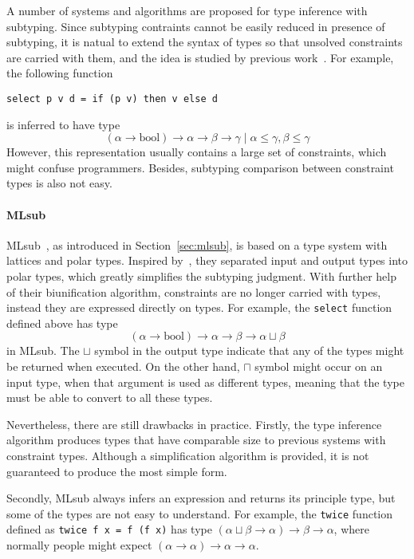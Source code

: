 A number of systems and algorithms are proposed for type inference with subtyping.
Since subtyping contraints cannot be easily reduced in presence of subtyping,
it is natual to extend the syntax of types so that unsolved constraints are carried with them,
and the idea is studied by previous work~\cite{RecConstraint1995, subcon1996}.
For example, the following function
\begin{verbatim}
select p v d = if (p v) then v else d
\end{verbatim}
is inferred to have type
$$(\alpha \to \text{bool}) \to \alpha \to \beta \to \gamma \mid \alpha \le \gamma, \beta \le \gamma$$
However, this representation usually contains a large set of constraints,
which might confuse programmers.
Besides, subtyping comparison between constraint types is also not easy.

\paragraph{MLsub}
MLsub~\cite{mlsub}, as introduced in Section~\ref{sec:mlsub},
is based on a type system with lattices and polar types.
Inspired by~\cite{pottier1998phd}, they separated input and output types into polar types,
which greatly simplifies the subtyping judgment.
With further help of their biunification algorithm,
constraints are no longer carried with types,
instead they are expressed directly on types.
For example, the \verb|select| function defined above has type
$$(\alpha \to \text{bool}) \to \alpha \to \beta \to \alpha \sqcup \beta$$
in MLsub.
The $\sqcup$ symbol in the output type indicate that
any of the types might be returned when executed.
On the other hand, $\sqcap$ symbol might occur on an input type,
when that argument is used as different types,
meaning that the type must be able to convert to all these types.

Nevertheless, there are still drawbacks in practice.
Firstly, the type inference algorithm produces types that have comparable size to
previous systems with constraint types.
Although a simplification algorithm is provided,
it is not guaranteed to produce the most simple form.

Secondly, MLsub always infers an expression and returns its principle type,
but some of the types are not easy to understand.
For example, the \verb|twice| function defined as \verb|twice f x = f (f x)|
has type $(\alpha \sqcup \beta \to \alpha) \to \beta \to \alpha$,
where normally people might expect $(\alpha \to \alpha) \to \alpha \to \alpha$.

